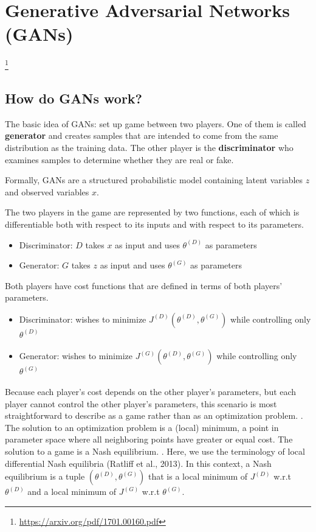 \documentclass{scrartcl}
\begin{document}
\section{Generative Adversarial Networks (GANs)}
\footnote{\url{https://arxiv.org/pdf/1701.00160.pdf}}
\subsection{How do GANs work?}
The basic idea of GANs: set up game between two players. One of them is called \textbf{generator} and creates samples that are intended to come from the same distribution as the training data. The other player is the \textbf{discriminator} who examines samples to determine whether they are real or fake.

Formally, GANs are a structured probabilistic model containing latent variables $z$ and observed variables $x$. 


The two players in the game are represented by two functions, each of which is differentiable both with respect to its inputs and with respect to its parameters.
\begin{itemize}
	\item
		Discriminator: $D$ takes $x$ as input and uses $\theta^{(D)}$ as parameters
	\item
		Generator: $G$ takes $z$ as input and uses $\theta^{(G)}$ as parameters
\end{itemize}

Both players have cost functions that are defined in terms of both players’ parameters.
\begin{itemize}
	\item
		Discriminator: wishes to minimize $J^{(D)}(\theta^{(D)},\theta^{(G)})$ while controlling only $\theta^{(D)}$
	\item
		Generator: wishes to minimize $J^{(G)}(\theta^{(D)},\theta^{(G)})$ while controlling only $\theta^{(G)}$
\end{itemize}


Because each player's cost depends on the other player’s parameters, but each player cannot control the other player’s parameters, this scenario is most straightforward to describe as a game rather than as an optimization problem. . The solution to an optimization problem is a (local) minimum, a point in parameter space where all neighboring points have greater or equal cost. The solution to a game is a Nash equilibrium. . Here, we use the terminology of local differential Nash equilibria
(Ratliff et al., 2013). In this context, a Nash equilibrium is a tuple $(\theta^{(D)},\theta^{(G)})$ that is a local minimum of $J^{(D)}$ w.r.t $\theta^{(D)}$ and a local minimum of $J^{(G)}$ w.r.t $\theta^{(G)}$.
\end{document}
